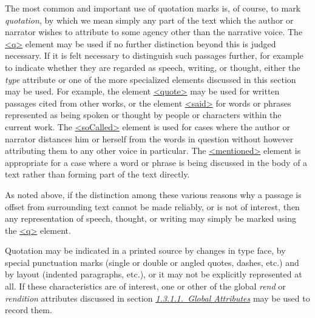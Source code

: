 The most common and important use of quotation marks is, of course, to mark \textit{quotation}, by which we mean simply any part of the text which the author or narrator wishes to attribute to some agency other than the narrative voice. The \hyperref[TEI.q]{<q>} element may be used if no further distinction beyond this is judged necessary. If it is felt necessary to distinguish such passages further, for example to indicate whether they are regarded as speech, writing, or thought, either the {\itshape type} attribute or one of the more specialized elements discussed in this section may be used. For example, the element \hyperref[TEI.quote]{<quote>} may be used for written passages cited from other works, or the element \hyperref[TEI.said]{<said>} for words or phrases represented as being spoken or thought by people or characters within the current work. The \hyperref[TEI.soCalled]{<soCalled>} element is used for cases where the author or narrator distances him or herself from the words in question without however attributing them to any other voice in particular. The \hyperref[TEI.mentioned]{<mentioned>} element is appropriate for a case where a word or phrase is being discussed in the body of a text rather than forming part of the text directly.\par
As noted above, if the distinction among these various reasons why a passage is offset from surrounding text cannot be made reliably, or is not of interest, then any representation of speech, thought, or writing may simply be marked using the \hyperref[TEI.q]{<q>} element.\par
Quotation may be indicated in a printed source by changes in type face, by special punctuation marks (single or double or angled quotes, dashes, etc.) and by layout (indented paragraphs, etc.), or it may not be explicitly represented at all. If these characteristics are of interest, one or other of the global {\itshape rend} or {\itshape rendition} attributes discussed in section \textit{\hyperref[STGA]{1.3.1.1.\ Global Attributes}} may be used to record them.\par
